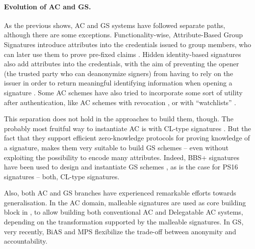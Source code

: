 \paragraph{Evolution of AC and GS.} %
As the previous shows, AC and GS systems have followed separate paths, although
there are some exceptions. Functionality-wise, Attribute-Based Group Signatures
introduce attributes into the credentials issued to group members, who can later
use them to prove pre-fixed claims \cite{emo09,aa14}. Hidden identity-based
signatures also add attributes into the credentials, with the aim of preventing
the opener (the trusted party who can deanonymize signers) from having to rely
on the issuer in order to return meaningful identifying information when opening
a signature \cite{ks07}. Some AC schemes have also tried to incorporate some
sort of utility after authentication, like AC schemes with revocation
\cite{cks10}, or with ``watchlists'' \needcite.

This separation does not hold in the approaches to build them, though. The
probably most fruitful way to instantiate AC is with CL-type signatures
\cite{cl02}. But the fact that they support efficient
zero-knowledge protocols for proving knowledge of a signature, makes them very
suitable to build GS schemes -- even without exploiting the possibility to
encode many attributes. Indeed, BBS+ signatures \cite{bbs04,cdl16b} have been
used to design and instantiate GS schemes \cite{gl19,dl21}, as is the case for
PS16 signatures \cite{ps16,cdl+20} -- both, CL-type signatures.

Also, both AC and GS branches have experienced remarkable efforts towards
generalisation. In the AC domain, malleable signatures are used as core building
block in \cite{cklm14}, to allow building both conventional AC and Delegatable
AC systems, depending on the transformation supported by the malleable
signatures. In GS, very recently, BiAS \cite{lnpy21} and MPS \cite{ngsy22}
flexibilize the trade-off between anonymity and accountability.

